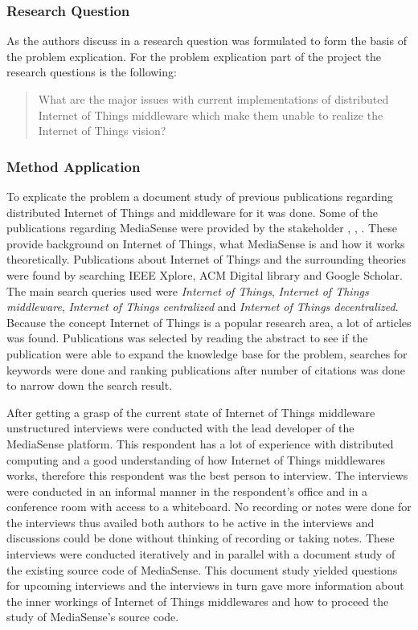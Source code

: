 \subsubsection{Research Question}
As the authors discuss in \cite{johannesson2012design} a research question was formulated to form the basis of the problem explication. For the problem explication part of the project the research questions is the following: 

\begin{quotation}
What are the major issues with current implementations of distributed Internet of Things middleware which make them unable to realize the Internet of Things vision?
\end{quotation}

\subsubsection{Method Application}
To explicate the problem a document study of previous publications regarding distributed Internet of Things and middleware for it was done. Some of the publications regarding MediaSense were provided by the stakeholder \cite{TheMediaSenseFramework}, \cite{Kanter539187}, \cite{Walters413794}. These provide background on Internet of Things, what MediaSense is and how it works theoretically. Publications about Internet of Things and the surrounding theories were found by searching IEEE Xplore, ACM Digital library and Google Scholar. The main search queries used were \emph{Internet of Things}, \emph{Internet of Things middleware}, \emph{Internet of Things centralized} and \emph{Internet of Things decentralized}. Because the concept Internet of Things is a popular research area, a lot of articles was found. Publications was selected by reading the abstract to see if the publication were able to expand the knowledge base for the problem, searches for keywords were done and ranking publications after number of citations was done to narrow down the search result. 

After getting a grasp of the current state of Internet of Things middleware unstructured interviews were conducted with the lead developer of the MediaSense platform. This respondent has a lot of experience with distributed computing and a good understanding of how Internet of Things middlewares works, therefore this respondent was the best person to interview. The interviews were conducted in an informal manner in the respondent's office and in a conference room with access to a whiteboard. No recording or notes were done for the interviews thus availed both authors to be active in the interviews and discussions could be done without thinking of recording or taking notes. These interviews were conducted iteratively and in parallel with a document study of the existing source code of MediaSense. This document study yielded questions for upcoming interviews and the interviews in turn gave more information about the inner workings of Internet of Things middlewares and how to proceed the study of MediaSense's source code.

